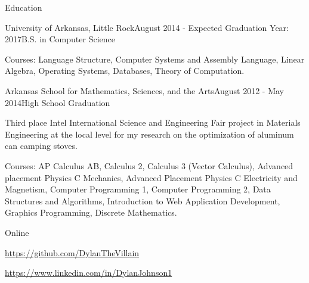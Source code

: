 \documentclass{resume} %
\begin{document}
\begin{rSection}{Education}

\begin{rSubsection}{University of Arkansas, Little Rock}{August 2014 - Expected Graduation Year: 2017}{B.S. in Computer Science}

	\item Courses: Language Structure, Computer Systems and Assembly Language, Linear Algebra, Operating Systems, Databases, Theory of Computation.
\end{rSubsection}

\begin{rSubsection}{Arkansas School for Mathematics, Sciences, and the Arts}{August 2012 - May 2014}{High School Graduation}

	\item Third place Intel International Science and Engineering Fair project in Materials Engineering at the local level for my research on the optimization of aluminum can camping stoves.
	\item Courses: AP Calculus AB, Calculus 2, Calculus 3 (Vector Calculus), Advanced placement Physics C Mechanics, Advanced Placement Physics C Electricity and Magnetism, Computer Programming 1, Computer Programming 2, Data Structures and Algorithms, Introduction to Web Application Development, Graphics Programming, Discrete Mathematics.
\end{rSubsection}

\end{rSection}

\begin{rSection}{Online}

	\item {\href{https://github.com/DylanTheVillain}{https://github.com/DylanTheVillain}}
	\item {\href{https://www.linkedin.com/in/DylanJohnson1}{https://www.linkedin.com/in/DylanJohnson1}}
\end{rSection}

\clearpage
\end{document}
